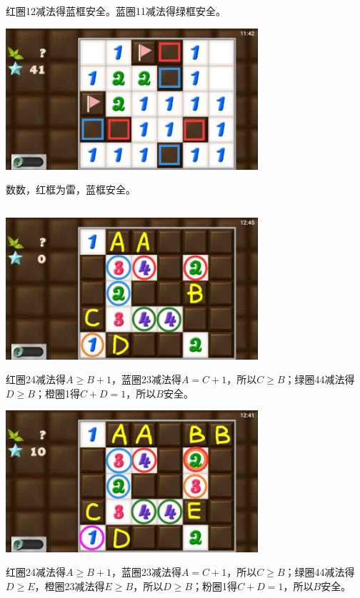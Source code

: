 红圈12减法得蓝框安全。蓝圈11减法得绿框安全。
\begin{center}
    \includegraphics[width=0.7\textwidth]{puzzlelow/224-7.jpg}
\end{center}
数数，红框为雷，蓝框安全。

\subsection{} %
\begin{center}
    \includegraphics[width=0.7\textwidth]{puzzlelow/225-1.jpg}
\end{center}
红圈24减法得$A\ge B+1$，蓝圈23减法得$A=C+1$，所以$C\ge B$；绿圈44减法得$D\ge B$；橙圈1得$C+D=1$，所以$B$安全。
\begin{center}
    \includegraphics[width=0.7\textwidth]{puzzlelow/225-2.jpg}
\end{center}
红圈24减法得$A\ge B+1$，蓝圈23减法得$A=C+1$，所以$C\ge B$；绿圈44减法得$D\ge E$，橙圈23减法得$E\ge B$，所以$D\ge B$；粉圈1得$C+D=1$，所以$B$安全。
